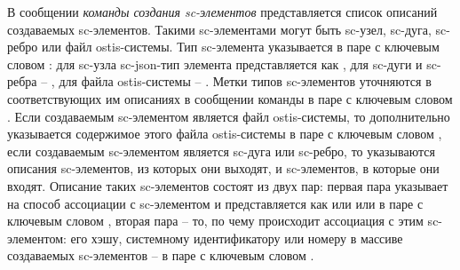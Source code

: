 В сообщении \textit{команды создания sc-элементов} представляется список описаний создаваемых sc-элементов. Такими sc-элементами могут быть sc-узел, sc-дуга, sc-ребро или файл ostis-системы. Тип sc-элемента указывается в паре с ключевым словом : для sc-узла sc-json-тип элемента представляется как , для sc-дуги и sc-ребра -- , для файла ostis-системы -- . Метки типов sc-элементов уточняются в соответствующих им описаниях в сообщении команды в паре с ключевым словом . Если создаваемым sc-элементом является файл ostis-системы, то дополнительно указывается содержимое этого файла ostis-системы в паре с ключевым словом , если создаваемым sc-элементом является sc-дуга или sc-ребро, то указываются описания sc-элементов, из которых они выходят, и sc-элементов, в которые они входят. Описание таких sc-элементов состоят из двух пар: первая пара указывает на способ ассоциации с sc-элементом и представляется как  или  или  в паре с ключевым словом , вторая пара -- то, по чему происходит ассоциация с этим sc-элементом: его хэшу, системному идентификатору или номеру в массиве создаваемых sc-элементов -- в паре с ключевым словом  .

